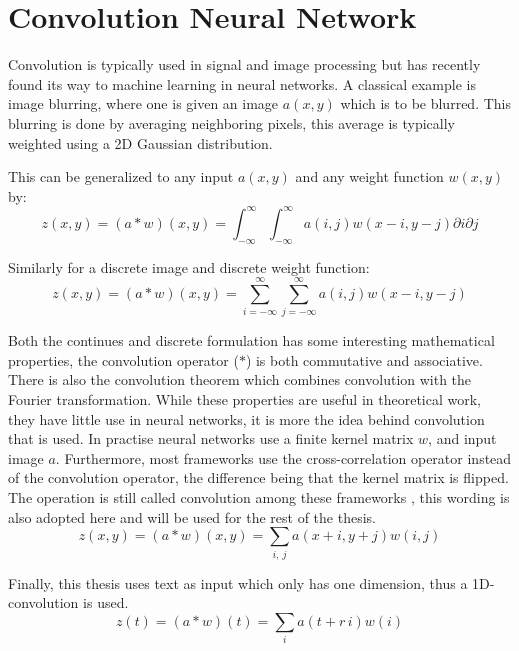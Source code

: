 \section{Convolution Neural Network}

Convolution is typically used in signal and image processing but has recently found its way to machine learning in neural networks. A classical example is image blurring, where one is given an image $a(x, y)$ which is to be blurred. This blurring is done by averaging neighboring pixels, this average is typically weighted using a 2D Gaussian distribution.

This can be generalized to any input $a(x, y)$ and any weight function $w(x, y)$ by:
\begin{equation}
z(x, y) = (a * w)(x, y) = \int_{-\infty}^\infty \int_{-\infty}^\infty a(i, j) w(x - i, y - j) \partial i \partial j
\end{equation}

Similarly for a discrete image and discrete weight function:
\begin{equation}
z(x, y) = (a * w)(x, y) = \sum_{i = -\infty}^\infty \sum_{j = -\infty}^\infty a(i, j) w(x - i, y - j)
\end{equation}

Both the continues and discrete formulation has some interesting mathematical properties, the convolution operator ($*$) is both commutative and associative. There is also the convolution theorem which combines convolution with the Fourier transformation. While these properties are useful in theoretical work, they have little use in neural networks, it is more the idea behind convolution that is used. In practise neural networks use a finite kernel matrix $w$, and input image $a$. Furthermore, most frameworks use the cross-correlation operator instead of the convolution operator, the difference being that the kernel matrix is flipped. The operation is still called convolution among these frameworks \cite{deep-learning}, this wording is also adopted here and will be used for the rest of the thesis.
\begin{equation}
z(x, y) = (a * w)(x, y) = \sum_{i,\ j} a(x + i, y + j) w(i, j)
\end{equation}

Finally, this thesis uses text as input which only has one dimension, thus a 1D-convolution is used.
\begin{equation}
z(t) = (a * w)(t) = \sum_{i} a(t+r\,i) w(i)
\end{equation}

